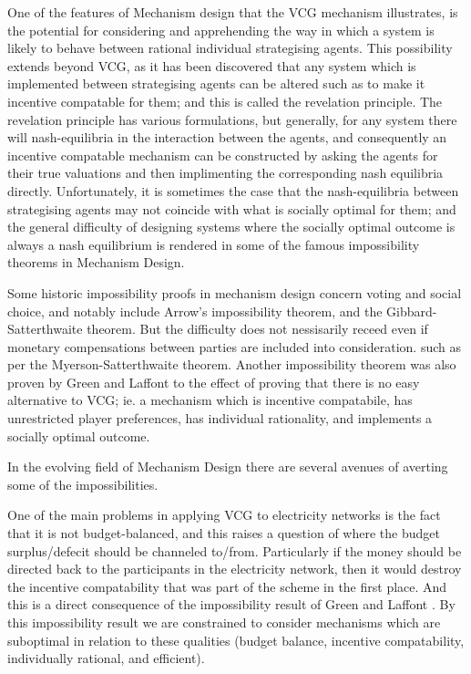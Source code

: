 One of the features of Mechanism design that the VCG mechanism illustrates, is the potential for considering and apprehending the way in which a system is likely to behave between rational individual strategising agents.
This possibility extends beyond VCG, as it has been discovered that any system which is implemented between strategising agents can be altered such as to make it incentive compatable for them; and this is called the revelation principle.\cite{RePEc:ecm:emetrp:v:41:y:1973:i:4:p:587-601} \cite[Chapter~2.3]{37377}
The revelation principle has various formulations, but generally, for any system there will nash-equilibria in the interaction between the agents, and consequently an incentive compatable mechanism can be constructed by asking the agents for their true valuations and then implimenting the corresponding nash equilibria directly.
Unfortunately, it is sometimes the case that the nash-equilibria between strategising agents may not coincide with what is socially optimal for them; and the general difficulty of designing systems where the socially optimal outcome is always a nash equilibrium is rendered in some of the famous impossibility theorems in Mechanism Design. %

Some historic impossibility proofs in mechanism design concern voting and social choice, and notably include Arrow's impossibility theorem, and the Gibbard-Satterthwaite theorem.
But the difficulty does not nessisarily receed even if monetary compensations between parties are included into consideration. such as per the Myerson-Satterthwaite theorem.
Another impossibility theorem was also proven by Green and Laffont \cite{29088} to the effect of proving that there is no easy alternative to VCG; ie. a mechanism which is incentive compatabile, has unrestricted player preferences, has individual rationality, and implements a socially optimal outcome.

In the evolving field of Mechanism Design there are several avenues of averting some of the impossibilities.


One of the main problems in applying VCG to electricity networks is the fact that it is not budget-balanced, and this raises a question of where the budget surplus/defecit should be channeled to/from.
Particularly if the money should be directed back to the participants in the electricity network, then it would destroy the incentive compatability that was part of the scheme in the first place.
And this is a direct consequence of the impossibility result of Green and Laffont \cite{29088}. By this impossibility result we are constrained to consider mechanisms which are suboptimal in relation to these qualities (budget balance, incentive compatability, individually rational, and efficient).

